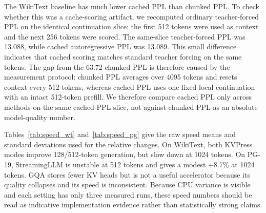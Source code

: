\documentclass{article}
\begin{document}
The WikiText baseline has much lower cached PPL than chunked PPL. To check whether this was a cache-scoring artifact, we recomputed ordinary teacher-forced PPL on the identical continuation slice: the first 512 tokens were used as context and the next 256 tokens were scored. The same-slice teacher-forced PPL was 13.088, while cached autoregressive PPL was 13.089. This small difference indicates that cached scoring matches standard teacher forcing on the same tokens. The gap from the 63.72 chunked PPL is therefore caused by the measurement protocol: chunked PPL averages over 4095 tokens and resets context every 512 tokens, whereas cached PPL uses one fixed local continuation with an intact 512-token prefill. We therefore compare cached PPL only across methods on the same cached-PPL slice, not against chunked PPL as an absolute model-quality number.

Tables~\ref{tab:speed_wt} and~\ref{tab:speed_pg} give the raw speed means and standard deviations used for the relative changes. On WikiText, both KVPress modes improve 128/512-token generation, but slow down at 1024 tokens. On PG-19, StreamingLLM is unstable at 512 tokens and gives a modest +8.7\% at 1024 tokens. GQA stores fewer KV heads but is not a useful accelerator because its quality collapses and its speed is inconsistent. Because CPU variance is visible and each setting has only three measured runs, these speed numbers should be read as indicative implementation evidence rather than statistically strong claims.
\end{document}
